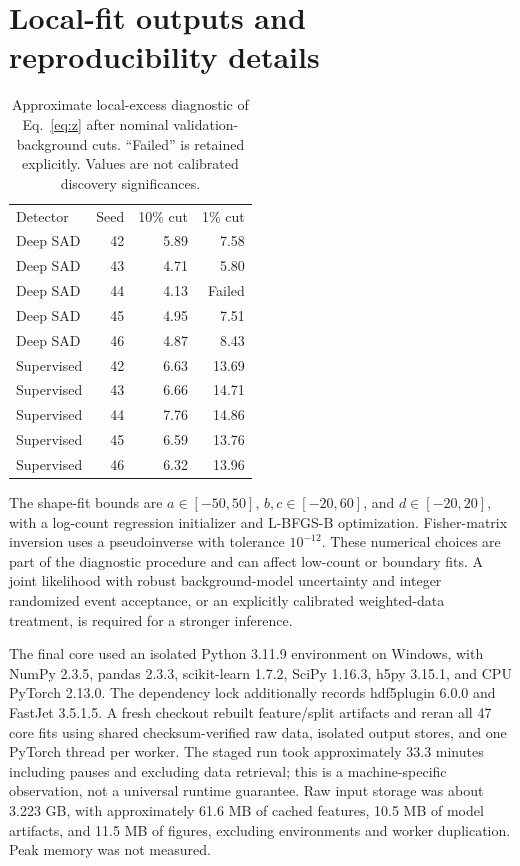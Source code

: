 \documentclass[reprint,aps,pra,amsmath,amssymb,floatfix,raggedbottom]{revtex4-2}
\begin{document}
\section{Local-fit outputs and reproducibility details}
\begin{table}[tbp]
\caption{Approximate local-excess diagnostic of Eq.~\eqref{eq:z} after nominal validation-background cuts. ``Failed'' is retained explicitly. Values are not calibrated discovery significances.}\label{tab:z}
\begin{ruledtabular}\begin{tabular}{lrrr}
Detector & Seed & 10\% cut & 1\% cut\\
Deep SAD & 42 & 5.89 & 7.58\\
Deep SAD & 43 & 4.71 & 5.80\\
Deep SAD & 44 & 4.13 & Failed\\
Deep SAD & 45 & 4.95 & 7.51\\
Deep SAD & 46 & 4.87 & 8.43\\
Supervised & 42 & 6.63 & 13.69\\
Supervised & 43 & 6.66 & 14.71\\
Supervised & 44 & 7.76 & 14.86\\
Supervised & 45 & 6.59 & 13.76\\
Supervised & 46 & 6.32 & 13.96\\
\end{tabular}\end{ruledtabular}
\end{table}

The shape-fit bounds are $a\in[-50,50]$, $b,c\in[-20,60]$, and $d\in[-20,20]$, with a log-count regression initializer and L-BFGS-B optimization. Fisher-matrix inversion uses a pseudoinverse with tolerance $10^{-12}$. These numerical choices are part of the diagnostic procedure and can affect low-count or boundary fits. A joint likelihood with robust background-model uncertainty and integer randomized event acceptance, or an explicitly calibrated weighted-data treatment, is required for a stronger inference.

The final core used an isolated Python 3.11.9 environment on Windows, with NumPy 2.3.5, pandas 2.3.3, scikit-learn 1.7.2, SciPy 1.16.3, h5py 3.15.1, and CPU PyTorch 2.13.0. The dependency lock additionally records hdf5plugin 6.0.0 and FastJet 3.5.1.5. A fresh checkout rebuilt feature/split artifacts and reran all 47 core fits using shared checksum-verified raw data, isolated output stores, and one PyTorch thread per worker. The staged run took approximately 33.3 minutes including pauses and excluding data retrieval; this is a machine-specific observation, not a universal runtime guarantee. Raw input storage was about 3.223 GB, with approximately 61.6 MB of cached features, 10.5 MB of model artifacts, and 11.5 MB of figures, excluding environments and worker duplication. Peak memory was not measured.
\end{document}
